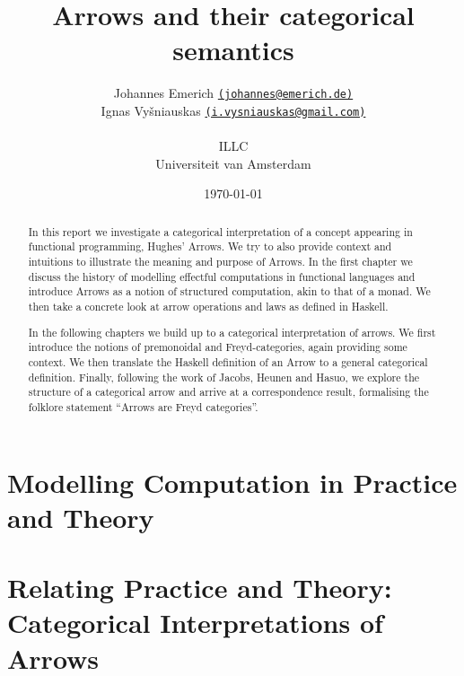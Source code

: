 \documentclass[12pt,a4paper,titlepage]{scrreprt}
\title{Arrows and their categorical semantics}
\author{
    Johannes Emerich
        \href{mailto:johannes@emerich.de}{
        \normalsize \texttt{(johannes@emerich.de)}}\\
    Ignas Vyšniauskas
        \href{mailto:i.vysniauskas@gmail.com}{
        \normalsize \texttt{(i.vysniauskas@gmail.com)}}\\
\\
  ILLC \\
  Universiteit van Amsterdam
}
\date{\today}
\theoremstyle{definition}
\theoremstyle{plain}
\begin{document}
\maketitle

\begin{abstract}
    In this report we investigate a categorical interpretation of a concept
    appearing in functional programming, Hughes' Arrows. We try to also provide
    context and intuitions to illustrate the meaning and purpose of Arrows.  In
    the first chapter we discuss the history of modelling effectful computations
    in functional languages and introduce Arrows as a notion of structured
    computation, akin to that of a monad. We then take a concrete look at arrow
    operations and laws as defined in Haskell.

    In the following chapters we build up to a categorical interpretation of
    arrows. We first introduce the notions of premonoidal and Freyd-categories,
    again providing some context. We then translate the Haskell definition of an
    Arrow to a general categorical definition. Finally, following the work of
    Jacobs, Heunen and Hasuo, we explore the structure of a categorical arrow
    and arrive at a correspondence result, formalising the folklore statement
    ``Arrows are Freyd categories''.
\end{abstract}

\tableofcontents


\chapter{Modelling Computation in Practice and Theory}
    
    
\chapter{Relating Practice and Theory: Categorical Interpretations of Arrows}
    
    
    


\nocite{mustard}
\printbibliography
\end{document}
